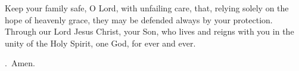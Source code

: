 \lettrine[lines=3]{K}{}eep your family safe, O Lord, with unfailing care, 
that, relying solely on the hope of heavenly grace,
they may be defended always by your protection.
Through our Lord Jesus Christ, your Son,
who lives and reigns with you in the unity of the Holy Spirit,
one God, for ever and ever. \par \Rbar.~Amen.
